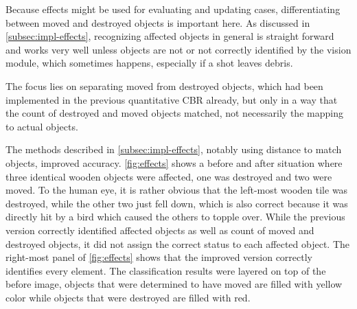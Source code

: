 Because effects might be used for evaluating and updating cases, differentiating between moved and destroyed objects is important here.
As discussed in \ref{subsec:impl-effects}, recognizing affected objects in general is straight forward and works very well unless objects are not or not correctly identified by the vision module, which sometimes happens, especially if a shot leaves debris.

The focus lies on separating moved from destroyed objects, which had been implemented in the previous quantitative \ac{CBR} already, but only in a way that the count of destroyed and moved objects matched, not necessarily the mapping to actual objects.

The methods described in \ref{subsec:impl-effects}, notably using distance to match objects, improved accuracy. \ref{fig:effects} shows a before and after situation where three identical wooden objects were affected, one was destroyed and two were moved.
To the human eye, it is rather obvious that the left-most wooden tile was destroyed, while the other two just fell down, which is also correct because it was directly hit by a bird which caused the others to topple over.
While the previous version correctly identified affected objects as well as count of moved and destroyed objects, it did not assign the correct status to each affected object.
The right-most panel of \ref{fig:effects} shows that the improved version correctly identifies every element. The classification results were layered on top of the before image, objects that were determined to have moved are filled with yellow color while objects that were destroyed are filled with red.

